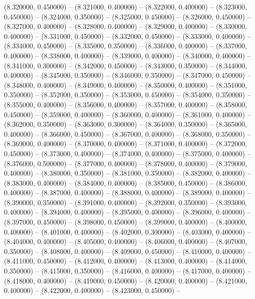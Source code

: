 (8.320000, 0.450000) -- 
(8.321000, 0.400000) -- 
(8.322000, 0.400000) -- 
(8.323000, 0.450000) -- 
(8.324000, 0.350000) -- 
(8.325000, 0.450000) -- 
(8.326000, 0.450000) -- 
(8.327000, 0.400000) -- 
(8.328000, 0.400000) -- 
(8.329000, 0.400000) -- 
(8.330000, 0.400000) -- 
(8.331000, 0.450000) -- 
(8.332000, 0.450000) -- 
(8.333000, 0.400000) -- 
(8.334000, 0.450000) -- 
(8.335000, 0.350000) -- 
(8.336000, 0.400000) -- 
(8.337000, 0.400000) -- 
(8.338000, 0.400000) -- 
(8.339000, 0.400000) -- 
(8.340000, 0.400000) -- 
(8.341000, 0.300000) -- 
(8.342000, 0.450000) -- 
(8.343000, 0.350000) -- 
(8.344000, 0.400000) -- 
(8.345000, 0.350000) -- 
(8.346000, 0.350000) -- 
(8.347000, 0.450000) -- 
(8.348000, 0.400000) -- 
(8.349000, 0.400000) -- 
(8.350000, 0.400000) -- 
(8.351000, 0.350000) -- 
(8.352000, 0.350000) -- 
(8.353000, 0.450000) -- 
(8.354000, 0.350000) -- 
(8.355000, 0.400000) -- 
(8.356000, 0.400000) -- 
(8.357000, 0.400000) -- 
(8.358000, 0.450000) -- 
(8.359000, 0.400000) -- 
(8.360000, 0.400000) -- 
(8.361000, 0.400000) -- 
(8.362000, 0.350000) -- 
(8.363000, 0.300000) -- 
(8.364000, 0.350000) -- 
(8.365000, 0.400000) -- 
(8.366000, 0.450000) -- 
(8.367000, 0.400000) -- 
(8.368000, 0.350000) -- 
(8.369000, 0.400000) -- 
(8.370000, 0.400000) -- 
(8.371000, 0.400000) -- 
(8.372000, 0.450000) -- 
(8.373000, 0.400000) -- 
(8.374000, 0.400000) -- 
(8.375000, 0.400000) -- 
(8.376000, 0.500000) -- 
(8.377000, 0.400000) -- 
(8.378000, 0.400000) -- 
(8.379000, 0.400000) -- 
(8.380000, 0.350000) -- 
(8.381000, 0.350000) -- 
(8.382000, 0.400000) -- 
(8.383000, 0.400000) -- 
(8.384000, 0.400000) -- 
(8.385000, 0.450000) -- 
(8.386000, 0.400000) -- 
(8.387000, 0.400000) -- 
(8.388000, 0.400000) -- 
(8.389000, 0.400000) -- 
(8.390000, 0.350000) -- 
(8.391000, 0.400000) -- 
(8.392000, 0.350000) -- 
(8.393000, 0.400000) -- 
(8.394000, 0.400000) -- 
(8.395000, 0.400000) -- 
(8.396000, 0.400000) -- 
(8.397000, 0.450000) -- 
(8.398000, 0.450000) -- 
(8.399000, 0.400000) -- 
(8.400000, 0.400000) -- 
(8.401000, 0.400000) -- 
(8.402000, 0.300000) -- 
(8.403000, 0.400000) -- 
(8.404000, 0.400000) -- 
(8.405000, 0.400000) -- 
(8.406000, 0.400000) -- 
(8.407000, 0.350000) -- 
(8.408000, 0.400000) -- 
(8.409000, 0.450000) -- 
(8.410000, 0.400000) -- 
(8.411000, 0.450000) -- 
(8.412000, 0.400000) -- 
(8.413000, 0.400000) -- 
(8.414000, 0.350000) -- 
(8.415000, 0.350000) -- 
(8.416000, 0.400000) -- 
(8.417000, 0.400000) -- 
(8.418000, 0.400000) -- 
(8.419000, 0.450000) -- 
(8.420000, 0.400000) -- 
(8.421000, 0.400000) -- 
(8.422000, 0.400000) -- 
(8.423000, 0.450000) -- 

